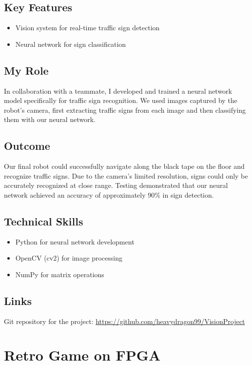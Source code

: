 \documentclass{article}
\begin{document}
\subsection{Key Features}
\begin{itemize}
    \item Vision system for real-time traffic sign detection
    \item Neural network for sign classification
\end{itemize}

\subsection{My Role}
In collaboration with a teammate, I developed and trained a neural network model specifically for traffic sign recognition. We used images captured by the robot's camera, first extracting traffic signs from each image and then classifying them with our neural network.

\subsection{Outcome}
Our final robot could successfully navigate along the black tape on the floor and recognize traffic signs. Due to the camera’s limited resolution, signs could only be accurately recognized at close range. Testing demonstrated that our neural network achieved an accuracy of approximately 90\% in sign detection.

\subsection{Technical Skills}
\begin{itemize}
    \item Python for neural network development
    \item OpenCV (cv2) for image processing
    \item NumPy for matrix operations
\end{itemize}

\subsection{Links}
Git repository for the project: \url{https://github.com/heavydragon99/VisionProject}


\section{Retro Game on FPGA}
\end{document}
